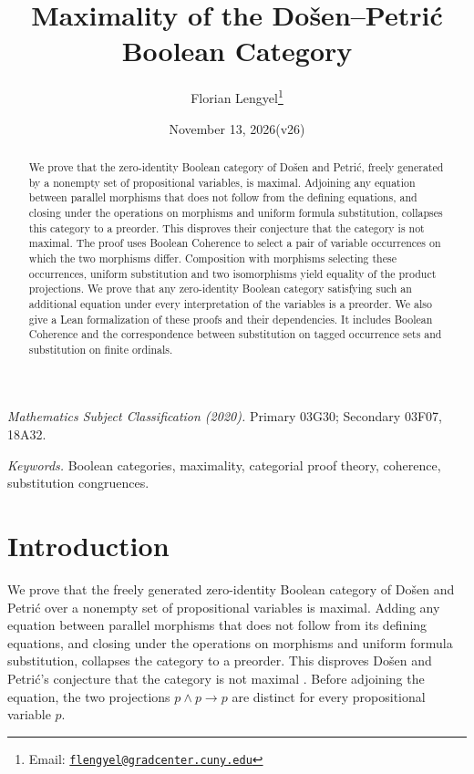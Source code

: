 \documentclass[11pt]{article}
\title{Maximality of the Do\v{s}en--Petri\'c Boolean Category}
\author{Florian Lengyel\thanks{Email: \href{mailto:flengyel@gradcenter.cuny.edu}{\texttt{flengyel@gradcenter.cuny.edu}}}}
\date{November 13, 2026\quad(v26)}
\begin{document}
\maketitle

\begin{abstract}
We prove that the zero-identity Boolean category of Do\v{s}en and
Petri\'c, freely generated by a nonempty set of propositional
variables, is maximal. Adjoining any equation between parallel morphisms that does not follow
from the defining equations, and closing under the operations on morphisms
and uniform formula substitution, collapses this category to a preorder.
This disproves their conjecture that the category is not maximal.
The proof uses Boolean Coherence to select a pair of variable
occurrences on which the two morphisms differ. Composition with morphisms
selecting these occurrences, uniform substitution and two
isomorphisms yield equality of the product projections. We
prove that any zero-identity Boolean category satisfying such an
additional equation under every interpretation of the variables is
a preorder. We also give a Lean formalization of these proofs and
their dependencies. It includes Boolean Coherence and the
correspondence between substitution on tagged occurrence sets and
substitution on finite ordinals.
\end{abstract}

\medskip
\noindent\textit{Mathematics Subject Classification (2020).}
Primary 03G30; Secondary 03F07, 18A32.

\smallskip
\noindent\textit{Keywords.} Boolean categories, maximality, categorial proof theory,
coherence, substitution congruences.

\section{Introduction}

We prove that the freely generated zero-identity Boolean category of
Do\v{s}en and Petri\'c over a nonempty set of propositional variables
is maximal. Adding any equation between parallel morphisms that does
not follow from its defining equations, and closing under the operations on
morphisms and uniform formula substitution, collapses the category
to a preorder. This disproves Do\v{s}en and Petri\'c's conjecture that the category
is not maximal \cite[\S14.2, p.~322]{DP}. Before adjoining the equation, the
two projections $p\wedge p\to p$ are distinct for every
propositional variable $p$.
\end{document}
